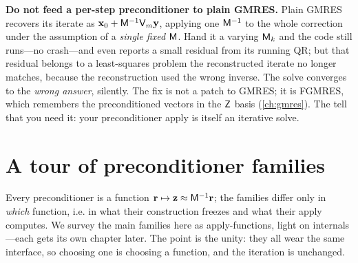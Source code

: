 \begin{pitfall}
\textbf{Do not feed a per-step preconditioner to plain GMRES.} Plain GMRES recovers its
iterate as $\mathbf{x}_0+\mathsf{M}^{-1}\mathsf{V}_m\mathbf{y}$, applying one $\mathsf{M}^{-1}$ to the whole
correction under the assumption of a \emph{single fixed} $\mathsf{M}$. Hand it a varying
$\mathsf{M}_k$ and the code still runs---no crash---and even reports a small residual from its
running QR; but that residual belongs to a least-squares problem the reconstructed iterate
no longer matches, because the reconstruction used the wrong inverse. The solve converges to
the \emph{wrong answer}, silently. The fix is not a patch to GMRES; it is FGMRES, which
remembers the preconditioned vectors in the $\mathsf{Z}$ basis (\cref{ch:gmres}). The tell that
you need it: your preconditioner apply is itself an iterative solve.
\end{pitfall}

\section{A tour of preconditioner families}
\label{sec:families}

Every preconditioner is a function $\mathbf{r}\mapsto\mathbf{z}\approx\mathsf{M}^{-1}\mathbf{r}$; the families
differ only in \emph{which} function, i.e. in what their construction freezes and what their
apply computes. We survey the main families here as apply-functions, light on internals---each
gets its own chapter later. The point is the unity: they all wear the same interface, so
choosing one is choosing a function, and the iteration is unchanged.

